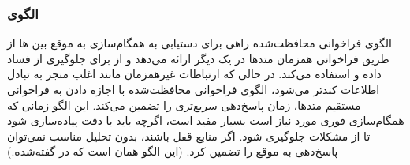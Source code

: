 \subsubsection{الگوی }
\label{archConGuardCallSec}
\begin{RTL}
الگوی فراخوانی محافظت‌شده \cite{ref4} راهی برای دستیابی به همگام‌سازی به موقع بین
ها از طریق فراخوانی همزمان متدها در یک
 دیگر ارائه می‌دهد و از  
برای جلوگیری از فساد داده و  استفاده می‌کند.
در حالی که ارتباطات غیرهمزمان مانند 
اغلب منجر به تبادل اطلاعات کندتر می‌شود، الگوی فراخوانی محافظت‌شده
با اجازه دادن به فراخوانی مستقیم متدها، زمان پاسخ‌دهی سریع‌تری را تضمین می‌کند.
این الگو زمانی که همگام‌سازی فوری مورد نیاز است بسیار مفید است،
اگرچه باید با دقت پیاده‌سازی شود تا از مشکلات 
جلوگیری شود. اگر منابع قفل باشند، بدون تحلیل مناسب نمی‌توان پاسخ‌دهی به موقع
را تضمین کرد.
(این الگو همان  است که در
\cite{ref1} گفته‌شده.)
\end{RTL}